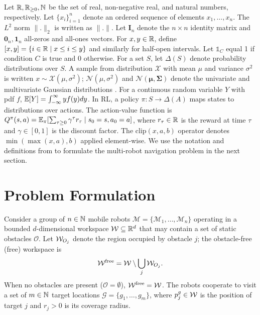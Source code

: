 \documentclass{article}
\providecommand{\obst}{\mathcal{O}}
\providecommand{\free}{\mathrm{free}}
\begin{document}
Let $\mathbb{R}, \mathbb{R}_{\geq 0}, \mathbb{N}$ be the set of real, non-negative real, and natural numbers, respectively. Let $\{x_i\}_{i=1}^n$ denote an ordered sequence of elements $x_1, \ldots, x_n$. The $L^2$ norm $\|.\|_2$ is written as $\|.\|$. Let $\mathbf{I}_n$ denote the $n\!\times\!n$ identity matrix and $\mathbf{0}_n, \mathbf{1}_n$ all-zeros and all-ones vectors. For $x, y \in \mathbb{R}$, define $[x,y] = \{i \in \mathbb{R} \mid x \leq i \leq y\}$ and similarly for half-open intervals. Let $\mathds{1}_C$ equal 1 if condition $C$ is true and 0 otherwise. For a set $S$, let $\Delta(S)$ denote probability distributions over $S$. A sample from distribution $\mathcal{X}$ with mean $\mu$ and variance $\sigma^2$ is written $x \sim \mathcal{X}(\mu, \sigma^2)$; $\mathcal{N}(\mu, \sigma^2)$ and $\mathcal{N}(\bm{\mu}, \mathbf{\Sigma})$ denote the univariate and multivariate Gaussian distributions \citep{bishop2006pattern}. For a continuous random variable $Y$ with pdf $f$, $\mathbb{E}[Y] = \int_{-\infty}^\infty y f(y) dy$. In RL, a policy $\pi : S \to \Delta(A)$ maps states to distributions over actions. The action-value function is $Q^\pi(s,a) = \mathbb{E}_\pi[\sum_{\tau \geq 0} \gamma^\tau r_\tau \mid s_0=s, a_0=a]$, where $r_\tau \in \mathbb{R}$ is the reward at time $\tau$ and $\gamma \in [0,1]$ is the discount factor. The $\text{clip}(x, a, b)$ operator denotes $\min(\max(x, a), b)$ applied element-wise. We use the notation and definitions from \citet{choset2005} to formulate the multi-robot navigation problem in the next section.

\section{Problem Formulation}
\label{sec:prob}

Consider a group of $n \in \mathbb{N}$ mobile robots $\mathcal{M} = \{ \mathcal{M}_1, \ldots, \mathcal{M}_n \}$ operating in a bounded $d$-dimensional workspace $\mathcal{W} \subseteq \mathbb{R}^d$ that may contain a set of static obstacles $\obst$. Let $\mathcal{W}_{O_j}$ denote the region occupied by obstacle $j$; the obstacle-free (free) workspace is
\begin{equation}
    \wspace^{\free} = \wspace \setminus \bigcup_j \wspace_{O_j}.
\end{equation}
When no obstacles are present ($\obst = \emptyset$), $\wspace^{\free} = \wspace$. The robots cooperate to visit a set of $m \in \mathbb{N}$ target locations $\mathcal{G} = \{ g_1, \ldots, g_m \}$, where $p_j^g \in \mathcal{W}$ is the position of target $j$ and $r_j > 0$ is its coverage radius.
\end{document}
